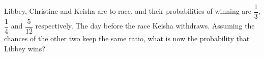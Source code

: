 Libbey, Christine and Keisha are to race, and their probabilities of winning are $\dfrac{1}{3}$, $\dfrac{1}{4}$ and $\dfrac{5}{12}$ respectively. The day before the race Keisha withdraws. Assuming the chances of the other two keep the same ratio, what is now the probability that Libbey wins?
